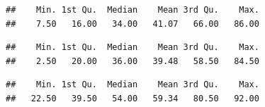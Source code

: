 \documentclass[
]{article}
\newenvironment{Shaded}{\begin{snugshade}}{\end{snugshade}}
\newcommand{\DecValTok}[1]{\textcolor[rgb]{0.00,0.00,0.81}{#1}}
\newcommand{\FunctionTok}[1]{\textcolor[rgb]{0.00,0.00,0.00}{#1}}
\newcommand{\NormalTok}[1]{#1}
\newcommand{\SpecialCharTok}[1]{\textcolor[rgb]{0.00,0.00,0.00}{#1}}
\begin{document}
\begin{verbatim}
##    Min. 1st Qu.  Median    Mean 3rd Qu.    Max. 
##    7.50   16.00   34.00   41.07   66.00   86.00
\end{verbatim}

\begin{Shaded}
\end{Shaded}

\begin{verbatim}
##    Min. 1st Qu.  Median    Mean 3rd Qu.    Max. 
##    2.50   20.00   36.00   39.48   58.50   84.50
\end{verbatim}

\begin{Shaded}
\end{Shaded}

\begin{verbatim}
##    Min. 1st Qu.  Median    Mean 3rd Qu.    Max. 
##   22.50   39.50   54.00   59.34   80.50   92.00
\end{verbatim}

\begin{Shaded}
\end{Shaded}
\end{document}
